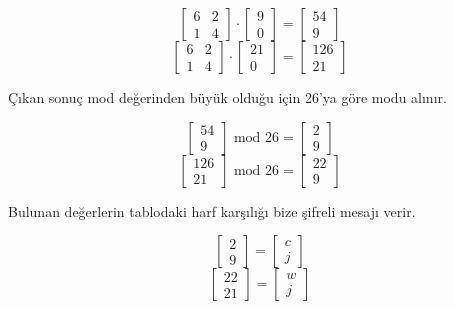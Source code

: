 \[ \begin{bmatrix} 6 & 2 \\ 1 & 4 \end{bmatrix} \cdot \begin{bmatrix} 9 \\ 0 \end{bmatrix} = \begin{bmatrix} 54 \\ 9 \end{bmatrix} \]
\[ \begin{bmatrix} 6 & 2 \\ 1 & 4 \end{bmatrix} \cdot \begin{bmatrix} 21 \\ 0 \end{bmatrix} = \begin{bmatrix} 126 \\ 21 \end{bmatrix} \]

Çıkan sonuç mod değerinden büyük olduğu için 26'ya göre modu alınır.

\[ \begin{bmatrix} 54 \\ 9 \end{bmatrix} \text{ mod } 26 = \begin{bmatrix} 2 \\ 9 \end{bmatrix} \]
\[ \begin{bmatrix} 126 \\ 21 \end{bmatrix} \text{ mod } 26 = \begin{bmatrix} 22 \\ 9 \end{bmatrix} \]

Bulunan değerlerin tablodaki harf karşılığı bize şifreli mesajı verir.

\[ \begin{bmatrix} 2 \\ 9 \end{bmatrix} = \begin{bmatrix} c \\ j \end{bmatrix} \]
\[ \begin{bmatrix} 22 \\ 21 \end{bmatrix} = \begin{bmatrix} w \\ j \end{bmatrix} \]

